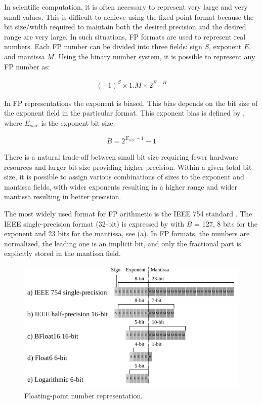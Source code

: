 In scientific computation, it is often necessary to represent very large and very small values. This is difficult to achieve using the fixed-point format because the bit size/width required to maintain both the desired precision and the desired range are very large. In such situations, FP formats are used to represent real numbers. Each FP number can be divided into three fields: sign $S$, exponent $E$, and mantissa $M$. Using the binary number system, it is possible to represent any FP number as:

\begin{eqnarray} \label{eq:float}
(-1)^{S} \times 1.M \times 2^{E-B}
\end{eqnarray}

In FP representations the exponent is biased. This bias depends on the bit size of the exponent field in the particular format. This exponent bias is defined by , where $E_{size}$ is the exponent bit size.

\begin{eqnarray} \label{eq:float_bias}
B=2^{E_{size}-1}-1
\end{eqnarray}

There is a natural trade-off between small bit size requiring fewer hardware resources and larger bit size providing higher precision. Within a given total bit size, it is possible to assign various combinations of sizes to the exponent and mantissa fields, with wider exponents resulting in a higher range and wider mantissa resulting in better precision.

The most widely used format for FP arithmetic is the IEEE 754 standard \cite{zuras2008ieee}. The IEEE single-precision format (32-bit) is expressed by  with $B$ = 127, 8 bits for the exponent and 23 bits for the mantissa, see (a). In FP formats, the numbers are normalized, the leading one is an implicit bit, and only the fractional part is explicitly stored in the mantissa field.

\begin{figure}[h!]
	\centering
	\includegraphics[width=1\columnwidth]{../figures/power_breakdown/floating_point.pdf}
	\caption{Floating-point number representation.}
	\label{fig:floating}
\end{figure}

